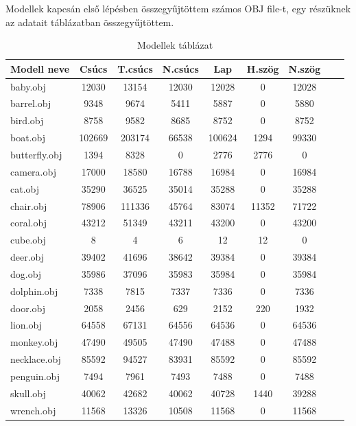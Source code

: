 
Modellek kapcsán első lépésben összegyűjtöttem számos OBJ file-t, egy részüknek az adatait  táblázatban összegyűjtöttem.
\bigskip
\begin{table}[h]
\centering
\caption{Modellek táblázat}
\bigskip
\label{tab:modellek}
\begin{tabular}{|l|c|c|c|c|c|c|c|c|}
Modell neve& Csúcs & T.csúcs & N.csúcs & Lap & H.szög & N.szög \\
\hline
baby.obj & 12030 & 13154 & 12030 & 12028 & 0 & 12028 \\
barrel.obj & 9348 & 9674 & 5411 & 5887 & 0 & 5880	\\
bird.obj & 8758 & 9582 & 8685 & 8752 & 0 & 8752 \\
boat.obj & 102669 & 203174 & 66538 & 100624 & 1294 & 99330\\
butterfly.obj & 1394 &	8328 &	0 & 2776 &	2776 &	0 \\
camera.obj & 17000 & 18580 & 16788 & 16984 & 0 & 16984 \\
cat.obj & 35290 & 36525 & 35014 & 35288 & 0 &	35288 \\
chair.obj & 78906 & 111336 & 45764 & 83074 & 11352 & 71722 \\
coral.obj & 43212 & 51349 & 43211 & 43200 & 0 & 43200 \\
cube.obj & 8 & 4 & 6 & 12 & 12 & 0 \\
deer.obj & 39402 & 41696 & 38642 & 39384 & 0 & 39384 \\
dog.obj & 35986 & 37096 & 35983 & 35984 & 0 & 35984 \\
dolphin.obj & 7338 & 7815 & 7337 & 7336 & 0 & 7336 \\
door.obj & 2058 & 2456 & 629 & 2152 &	220 & 1932 \\
lion.obj & 64558 & 67131 & 64556 & 64536 & 0 & 64536 \\
monkey.obj & 47490 & 49505 & 47490 & 47488 & 0 & 47488 \\
necklace.obj & 85592 &	94527 & 83931 & 85592 & 0 & 85592 \\
penguin.obj & 7494 & 7961 & 7493 & 7488 & 0 & 7488 \\
skull.obj & 40062 & 42682 & 40062 & 40728 & 1440 & 39288 \\
wrench.obj & 11568 & 13326 & 10508 & 11568 & 0 & 11568 \\
\hline
\end{tabular}
\label{fig:modellekt}
\end{table}

